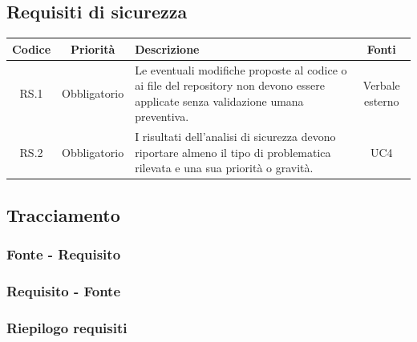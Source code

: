 \documentclass[12pt, a4paper]{article}
\begin{document}
\subsection{Requisiti di sicurezza}\label{requisiti-di-sicurezza}

\begin{table}[ht]
    \centering
    \renewcommand{\arraystretch}{1.3}
    \begin{tabularx}{\textwidth}{|c|c|X|c|}
        \hline
        \textbf{Codice} & \textbf{Priorità} & \textbf{Descrizione} & \textbf{Fonti} \\ \hline
        RS.1 & Obbligatorio & Le eventuali modifiche proposte al codice o ai file del repository non
        devono essere applicate senza validazione umana preventiva. & Verbale esterno \\ \hline
        RS.2 & Obbligatorio & I risultati dell'analisi di sicurezza devono riportare almeno il tipo di
        problematica rilevata e una sua priorità o gravità. & UC4 \\ \hline
    \end{tabularx}
\end{table}

\subsection{Tracciamento}\label{tracciamento}

\subsubsection{Fonte - Requisito}\label{fonte---requisito}

\subsubsection{Requisito - Fonte}\label{requisito---fonte}

\subsubsection{Riepilogo requisiti}\label{riepilogo-requisiti}
\end{document}
